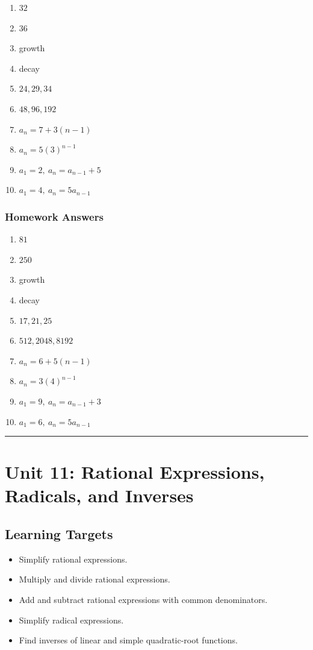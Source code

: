 \documentclass[11pt]{book}
\begin{document}
\begin{enumerate}
\item \(32\)
\item \(36\)
\item growth
\item decay
\item \(24,29,34\)
\item \(48,96,192\)
\item \(a_n=7+3(n-1)\)
\item \(a_n=5(3)^{n-1}\)
\item \(a_1=2,\ a_n=a_{n-1}+5\)
\item \(a_1=4,\ a_n=5a_{n-1}\)
\end{enumerate}

\subsection{Homework Answers}

\begin{enumerate}
\item \(81\)
\item \(250\)
\item growth
\item decay
\item \(17,21,25\)
\item \(512,2048,8192\)
\item \(a_n=6+5(n-1)\)
\item \(a_n=3(4)^{n-1}\)
\item \(a_1=9,\ a_n=a_{n-1}+3\)
\item \(a_1=6,\ a_n=5a_{n-1}\)
\end{enumerate}

\bigskip\hrule\bigskip

\chapter{Unit 11: Rational Expressions, Radicals, and Inverses}

\section{Learning Targets}

\begin{itemize}
\item Simplify rational expressions.
\item Multiply and divide rational expressions.
\item Add and subtract rational expressions with common denominators.
\item Simplify radical expressions.
\item Find inverses of linear and simple quadratic-root functions.
\end{itemize}
\end{document}
